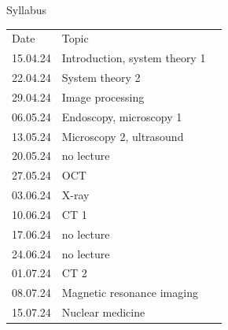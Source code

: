 \begin{frame}[c]{Syllabus}
\begin{table}[]
\begin{tabular}{rll}
\multicolumn{1}{l}{Date} & \multicolumn{1}{l}{Topic}      	& \multicolumn{1}{c}{} \\
15.04.24                 & Introduction, system theory 1		&                      \\
22.04.24                 & System theory 2               			&                      \\
29.04.24                 & Image processing             		&                      \\
06.05.24                 & Endoscopy, microscopy 1 		&                      \\
13.05.24                 & Microscopy 2, ultrasound       		&                      \\
20.05.24                 & no lecture	     			  		&                      \\
27.05.24                 & OCT		                				&                      \\
03.06.24                 & X-ray	                      			&                      \\
10.06.24                 & CT 1						&                      \\
17.06.24                 & no lecture  					&                      \\
24.06.24                 & no lecture                         			&                      \\
01.07.24                 & CT 2                           			&                      \\
08.07.24                 & Magnetic resonance imaging         	&                      \\
15.07.24                 & Nuclear medicine				&
\end{tabular}
\end{table}
\end{frame}

